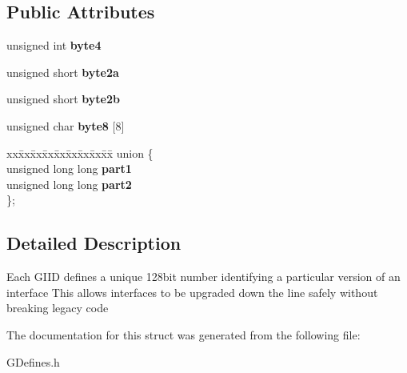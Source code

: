\subsection*{Public Attributes}
\begin{DoxyCompactItemize}
\item 
\hypertarget{struct_g_w_1_1_g_u_u_i_i_d_a017e04c2cb5c5bab165bf4ec0fa3ca55}{}\label{struct_g_w_1_1_g_u_u_i_i_d_a017e04c2cb5c5bab165bf4ec0fa3ca55} 
unsigned int {\bfseries byte4}
\item 
\hypertarget{struct_g_w_1_1_g_u_u_i_i_d_a57b18450de3bffef5a6e39d9dcb6b68f}{}\label{struct_g_w_1_1_g_u_u_i_i_d_a57b18450de3bffef5a6e39d9dcb6b68f} 
unsigned short {\bfseries byte2a}
\item 
\hypertarget{struct_g_w_1_1_g_u_u_i_i_d_ab5045e59e0d3aa82a27208a063b9cbb6}{}\label{struct_g_w_1_1_g_u_u_i_i_d_ab5045e59e0d3aa82a27208a063b9cbb6} 
unsigned short {\bfseries byte2b}
\item 
\hypertarget{struct_g_w_1_1_g_u_u_i_i_d_a631f2e8efb3ddd9794c068e0b9000cce}{}\label{struct_g_w_1_1_g_u_u_i_i_d_a631f2e8efb3ddd9794c068e0b9000cce} 
unsigned char {\bfseries byte8} \mbox{[}8\mbox{]}
\item 
\hypertarget{struct_g_w_1_1_g_u_u_i_i_d_aa51f004bf72e52a4e15b7568b9a7ec50}{}\label{struct_g_w_1_1_g_u_u_i_i_d_aa51f004bf72e52a4e15b7568b9a7ec50} 
\begin{tabbing}
xx\=xx\=xx\=xx\=xx\=xx\=xx\=xx\=xx\=\kill
union \{\\
\>unsigned long long {\bfseries part1}\\
\>unsigned long long {\bfseries part2}\\
\}; \\

\end{tabbing}\end{DoxyCompactItemize}


\subsection{Detailed Description}
Each G\+I\+ID defines a unique 128bit number identifying a particular version of an interface This allows interfaces to be upgraded down the line safely without breaking legacy code 

The documentation for this struct was generated from the following file\+:\begin{DoxyCompactItemize}
\item 
G\+Defines.\+h\end{DoxyCompactItemize}
